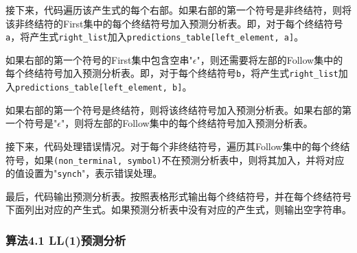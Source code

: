 \documentclass[lang=cn,11pt,a4paper]{elegantpaper}
\begin{document}
接下来，代码遍历该产生式的每个右部。如果右部的第一个符号是非终结符，则将该非终结符的First集中的每个终结符号加入预测分析表。即，对于每个终结符号\lstinline{a}，将产生式\lstinline{right_list}加入\lstinline{predictions_table[left_element, a]}。

如果右部的第一个符号的First集中包含空串"$\epsilon$"，则还需要将左部的Follow集中的每个终结符号加入预测分析表。即，对于每个终结符号\lstinline{b}，将产生式\lstinline{right_list}加入\lstinline{predictions_table[left_element, b]}。

如果右部的第一个符号是终结符，则将该终结符号加入预测分析表。如果右部的第一个符号是"$\epsilon$"，则将左部的Follow集中的每个终结符号加入预测分析表。

接下来，代码处理错误情况。对于每个非终结符号，遍历其Follow集中的每个终结符号，如果\lstinline{(non_terminal, symbol)}不在预测分析表中，则将其加入，并将对应的值设置为"\lstinline{synch}"，表示错误处理。

最后，代码输出预测分析表。按照表格形式输出每个终结符号，并在每个终结符号下面列出对应的产生式。如果预测分析表中没有对应的产生式，则输出空字符串。

\subsubsection{算法4.1 LL(1)预测分析}
\end{document}
